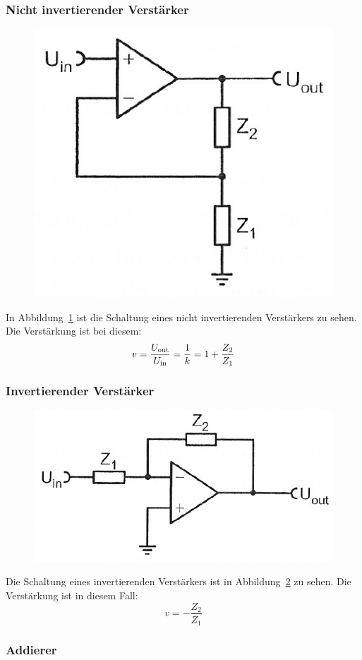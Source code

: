 \FloatBarrier
\subsubsection{Nicht invertierender Verstärker}

\begin{figure}[htbp]
	\centering
	\includegraphics[width=.4\linewidth]{Anleitung/5_6-4.png}
	\caption{%
		\cite[Abbildung~5/6.4]{physik313-Anleitung}
	}
	\label{fig:5_6-4}
\end{figure}

In Abbildung~\ref{fig:5_6-4} ist die Schaltung eines nicht invertierenden
Verstärkers zu sehen. Die Verstärkung ist bei diesem:
\[
    v = \frac{U_\text{out}}{U_\text{in}} = \frac 1k = 1 + \frac{Z_2}{Z_1}
\]

\FloatBarrier
\subsubsection{Invertierender Verstärker}

\begin{figure}[htbp]
	\centering
	\includegraphics[width=.4\linewidth]{Anleitung/5_6-5.png}
	\caption{%
		\cite[Abbildung~5/6.5]{physik313-Anleitung}
	}
	\label{fig:5_6-5}
\end{figure}

Die Schaltung eines invertierenden Verstärkers ist in
Abbildung~\ref{fig:5_6-5} zu sehen. Die Verstärkung ist in diesem Fall:
\[
    v = -\frac{Z_2}{Z_1}
\]

\FloatBarrier
\subsubsection{Addierer}

